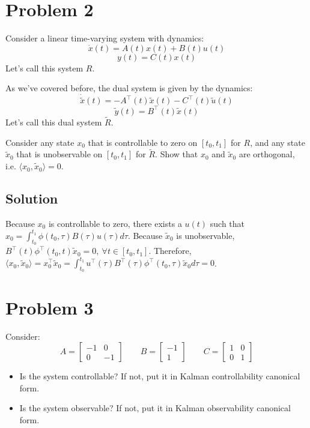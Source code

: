 \documentclass[11pt]{report}
\newcommand{\T}{\intercal}
\begin{document}
\pagebreak
\section*{Problem 2}

Consider a linear time-varying system with dynamics:
\[
\dot x(t) = A(t) x(t) + B(t) u(t)
\]
\[
y(t) = C(t) x(t)
\]
Let's call this system $R$.

As we've covered before, the dual system is given by the dynamics:
\[
\dot{\tilde{x}}(t) = -A^\T(t)\tilde x(t) - C^\T(t) \tilde u(t)
\]
\[
\tilde y(t) = B^\T(t) \tilde x(t)
\]
Let's call this dual system $\tilde R$.

Consider any state $x_0$ that is controllable to zero on $[t_0,t_1]$ for $R$, and any state $\tilde x_0$ that is unobservable on $[t_0,t_1]$ for $\tilde R$. Show that $x_0$ and $\tilde x_0$ are orthogonal, i.e. $\langle x_0, \tilde x_0 \rangle = 0$.


\subsection*{Solution}
Because $x_0$ is controllable to zero, there exists a $u(t)$ such that $x_0 = \int_{t_0}^{t_1} \phi(t_0, \tau) B(\tau) u(\tau) d\tau$. Because $\tilde x_0$ is unobservable, $B^\T(t) \phi^\T(t_0, t) \tilde x_0 = 0,~\forall t \in [t_0, t_1]$. Therefore, $\langle x_0, \tilde x_0 \rangle = x_0^\T \tilde x_0 = \int_{t_0}^{t_1} u^\T(\tau) B^\T(\tau) \phi^\T(t_0, \tau) \tilde x_0 d\tau = 0$.

\pagebreak
\section*{Problem 3}



Consider:
\[
A =
\begin{bmatrix}
-1 & 0 \\
0 & -1
\end{bmatrix}
\qquad
B =
\begin{bmatrix}
-1 \\
1
\end{bmatrix}
\qquad
C =
\begin{bmatrix}
1 & 0 \\
0 & 1
\end{bmatrix}
\]
\begin{itemize}
\item Is the system controllable? If not, put it in Kalman controllability canonical form.
\item Is the system observable? If not, put it in Kalman observability canonical form.
\end{itemize}
\end{document}
